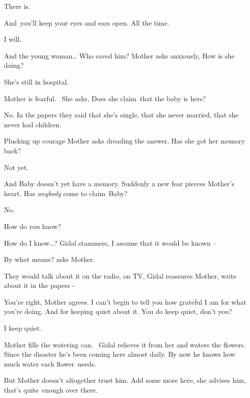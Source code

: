 \documentclass[twoside,11pt]{book}
\begin{document}
{\textquotedbl}There is.{\textquotedbl} 

{\textquotedbl}And~you'll keep your eyes and ears open. All the time.{\textquotedbl} 

{\textquotedbl}I will.{\textquotedbl} 

{\textquotedbl}And the young woman{\dots} Who saved him?{\textquotedbl} Mother asks anxiously, {\textquotedbl}How is she
doing?{\textquotedbl} 

{\textquotedbl}She's still in hospital.{\textquotedbl} 

Mother is fearful. \ She asks, {\textquotedbl}Does she claim{\ }that the baby is hers?{\textquotedbl} 

{\textquotedbl}No. In the papers they said that she's single, that she never married, that she never had
children.{\textquotedbl} 

Plucking up courage Mother asks dreading the answer, {\textquotedbl}Has she got her memory back?{\textquotedbl} 

{\textquotedbl}Not yet.{\textquotedbl} 

{\textquotedbl}And Baby doesn't yet have a memory.{\textquotedbl} Suddenly a new fear pierces Mother's heart.
{\textquotedbl}Has \textit{anybody }come to claim~Baby?{\textquotedbl} 

{\textquotedbl}No.{\textquotedbl} 

{\textquotedbl}How do you know?{\textquotedbl}

{\textquotedbl}How do I know{\dots}?{\textquotedbl} Gidal stammers, {\textquotedbl}I assume that it would be known
--{\textquotedbl} 

{\textquotedbl}By what means?{\textquotedbl} asks Mother.

{\textquotedbl}They would talk about it on the radio, on TV,{\textquotedbl} Gidal reassures Mother, {\textquotedbl}write
 about it in the papers -{\textquotedbl} 

{\textquotedbl}You're right,{\textquotedbl} Mother agrees. {\textquotedbl}I can't begin to tell you how grateful I am
for what you're doing. And for keeping quiet about it. You do keep quiet, don't you?{\textquotedbl} 

{\textquotedbl}I keep quiet.{\textquotedbl}

Mother fills the watering can. ~Gidal relieves it from her and waters the flowers. Since the disaster he's been coming
here almost daily. By now he knows how much water each flower\ needs. 

But Mother doesn't altogether trust him. {\textquotedbl}Add some more here,{\textquotedbl} she advises him,
{\textquotedbl}that's quite~enough over there.{\textquotedbl} 
\end{document}
